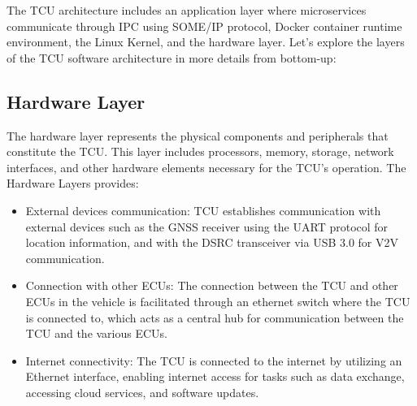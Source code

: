 \documentclass[
12pt,
oneside, 
onehalfspacing, 
nolistspacing, 
parskip, 
chapterinoneline, 
]{AASTCOMPUTER}
\begin{document}
The TCU architecture includes an application layer where microservices communicate through IPC using SOME/IP protocol, Docker container runtime environment, the Linux Kernel, and the hardware layer. 
Let's explore the layers of the TCU software architecture in more details from bottom-up: 
\subsection{Hardware Layer}
The hardware layer represents the physical components and peripherals that constitute the TCU. This layer includes processors, memory, storage, network interfaces, and other hardware elements necessary for the TCU's operation.
The Hardware Layers provides:
    \begin{itemize}
      \item External devices communication: TCU establishes communication with external devices such as the GNSS receiver using the UART protocol for location information, and with the DSRC transceiver via USB 3.0 for V2V communication. 
      \item Connection with other ECUs: The connection between the TCU and other ECUs in the vehicle is facilitated through an ethernet switch where the TCU is connected to, which acts as a central hub for communication between the TCU and the various ECUs.
      \item Internet connectivity: The TCU is connected to the internet by utilizing an Ethernet interface, enabling internet access for tasks such as data exchange, accessing cloud services, and software updates.
    \end{itemize}
\end{document}
